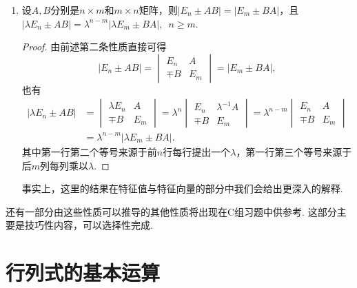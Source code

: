 \begin{enumerate}
\begin{proof}
              本条的其他结论推导类似于上方，在此不再赘述，感兴趣的读者可以自行推导（关键在于第三类分块初等矩阵行列式为1），实际上结论并不是很重要，重要的是在于领悟使用行列式分块计算性质和打洞法的基本方法.
          \end{proof}

    \item 设$A,B$分别是$n \times m$和$m \times n$矩阵，则$|E_n \pm AB|=|E_m \pm BA|$，且 \\
          $|\lambda E_n \pm AB|=\lambda^{n-m}|\lambda E_m \pm BA|,\enspace n \geqslant m$.
          \begin{proof}
              由前述第二条性质直接可得
              \[|E_n \pm AB|=\begin{vmatrix}
                      E_n & A \\ \mp B & E_m
                  \end{vmatrix}=|E_m \pm BA|,\]
              也有
              \begin{align*}
                  |\lambda E_n \pm AB|
                   & =\begin{vmatrix}
                          \lambda E_n & A \\ \mp B & E_m
                      \end{vmatrix}=\lambda^n
                  \begin{vmatrix}
                      E_n & \lambda^{-1}A \\ \mp B & E_m
                  \end{vmatrix}=\lambda^{n-m}\begin{vmatrix}
                                                 E_n & A \\ \mp B & E_m
                                             \end{vmatrix} \\
                   & = \lambda^{n-m}|\lambda E_m \pm BA|.
              \end{align*}
              其中第一行第二个等号来源于前$n$行每行提出一个$\lambda$，第一行第三个等号来源于后$m$列每列乘以$\lambda$.
          \end{proof}

          事实上，这里的结果在特征值与特征向量的部分中我们会给出更深入的解释.
\end{enumerate}

还有一部分由这些性质可以推导的其他性质将出现在C组习题中供参考. 这部分主要是技巧性内容，可以选择性完成.

\section{行列式的基本运算}

